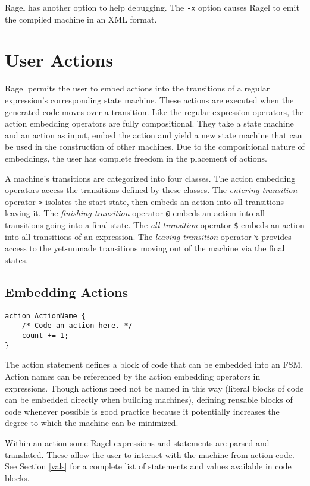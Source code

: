 \documentclass[letterpaper,11pt,oneside]{book}
\newcommand{\verbspace}{\vspace{10pt}}
\begin{document}
Ragel has another option to help debugging. The \verb|-x| option causes Ragel
to emit the compiled machine in an XML format.

\chapter{User Actions}

Ragel permits the user to embed actions into the transitions of a regular
expression's corresponding state machine. These actions are executed when the
generated code moves over a transition.  Like the regular expression operators,
the action embedding operators are fully compositional. They take a state
machine and an action as input, embed the action and yield a new state machine
that can be used in the construction of other machines. Due to the
compositional nature of embeddings, the user has complete freedom in the
placement of actions.

A machine's transitions are categorized into four classes. The action embedding
operators access the transitions defined by these classes.  The {\em entering
transition} operator \verb|>| isolates the start state, then embeds an action
into all transitions leaving it. The {\em finishing transition} operator
\verb|@| embeds an action into all transitions going into a final state.  The
{\em all transition} operator \verb|$| embeds an action into all transitions of
an expression. The {\em leaving transition} operator \verb|%| provides access
to the yet-unmade transitions moving out of the machine via the final states. 

\section{Embedding Actions}

\begin{verbatim}
action ActionName {
    /* Code an action here. */
    count += 1;
}
\end{verbatim}
\verbspace

The action statement defines a block of code that can be embedded into an FSM.
Action names can be referenced by the action embedding operators in
expressions. Though actions need not be named in this way (literal blocks
of code can be embedded directly when building machines), defining reusable
blocks of code whenever possible is good practice because it potentially increases the
degree to which the machine can be minimized. 

Within an action some Ragel expressions and statements are parsed and
translated. These allow the user to interact with the machine from action code.
See Section \ref{vals} for a complete list of statements and values available
in code blocks. 
\end{document}
